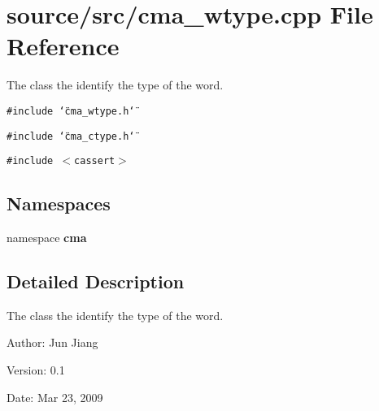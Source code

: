 \section{source/src/cma\_\-wtype.cpp File Reference}
\label{cma__wtype_8cpp}
The class the identify the type of the word. 

{\tt \#include \char`\"{}cma\_\-wtype.h\char`\"{}}\par
{\tt \#include \char`\"{}cma\_\-ctype.h\char`\"{}}\par
{\tt \#include $<$cassert$>$}\par
\subsection*{Namespaces}
\begin{CompactItemize}
\item 
namespace \textbf{cma}
\end{CompactItemize}


\subsection{Detailed Description}
The class the identify the type of the word. 

\begin{Desc}
\item[Author:]Jun Jiang \end{Desc}
\begin{Desc}
\item[Version:]0.1 \end{Desc}
\begin{Desc}
\item[Date:]Mar 23, 2009 \end{Desc}
